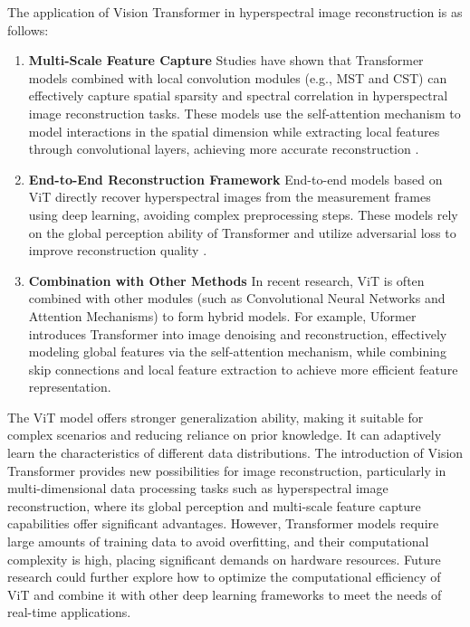 \documentclass[preprint,review,12pt]{elsarticle}
\begin{document}
The application of Vision Transformer in hyperspectral image reconstruction is as follows:

\begin{enumerate}
	\item \textbf{Multi-Scale Feature Capture} Studies have shown that Transformer models combined with local convolution modules (e.g., MST and CST) can effectively capture spatial sparsity and spectral correlation in hyperspectral image reconstruction tasks. These models use the self-attention mechanism to model interactions in the spatial dimension while extracting local features through convolutional layers, achieving more accurate reconstruction \cite{cai2022}.
	\item \textbf{End-to-End Reconstruction Framework} End-to-end models based on ViT directly recover hyperspectral images from the measurement frames using deep learning, avoiding complex preprocessing steps. These models rely on the global perception ability of Transformer and utilize adversarial loss to improve reconstruction quality \cite{miao2019}.
	\item \textbf{Combination with Other Methods} In recent research, ViT is often combined with other modules (such as Convolutional Neural Networks and Attention Mechanisms) to form hybrid models. For example, Uformer introduces Transformer into image denoising and reconstruction, effectively modeling global features via the self-attention mechanism, while combining skip connections and local feature extraction to achieve more efficient feature representation.
\end{enumerate}

The ViT model offers stronger generalization ability, making it suitable for complex scenarios and reducing reliance on prior knowledge. It can adaptively learn the characteristics of different data distributions. The introduction of Vision Transformer provides new possibilities for image reconstruction, particularly in multi-dimensional data processing tasks such as hyperspectral image reconstruction, where its global perception and multi-scale feature capture capabilities offer significant advantages. However, Transformer models require large amounts of training data to avoid overfitting, and their computational complexity is high, placing significant demands on hardware resources. Future research could further explore how to optimize the computational efficiency of ViT and combine it with other deep learning frameworks to meet the needs of real-time applications.
\end{document}
